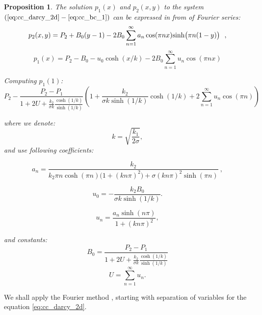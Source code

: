 \documentclass[a4paper,10pt]{article}
\newtheorem{prop}{Proposition}
\begin{document}
\begin{prop}
The solution $p_1(x)$ and $p_2(x,y)$ to the system $(\ref{eq:cc_darcy_2d} - \ref{eq:cc_bc_1})$
can be expressed in from of Fourier series:
\begin{equation}
    \label{eq:p2_series}
    p_2(x,y) = P_2 + B_0(y-1) -2B_0 \sum_{n=1}^\infty a_n \cos(\pi n x) {\rm sinh} \big(\pi n(1-y)\big)  \ \ ,
\end{equation}
%
\begin{equation}
    \label{eq:p2_series}
    p_1(x) = P_2-B_0 -u_0 \cosh(x/k) -2B_0 \sum_{n=1}^\infty  u_n \cos(\pi n x) 
\end{equation}

Computing $p_1(1)$:
\[
    P_2
    - \frac{P_2 - P_1}{1 + 2  U + \frac{k_2}{\sigma k} \frac{\cosh(1/k)}{\sinh(1/k)}}  \left(
        1
        +\frac{k_2 }{\sigma k\sinh(1/k)} \cosh(1/k) 
        +2 \sum_{n=1}^\infty  u_n \cos(\pi n) 
      \right)
\]

where we denote:
\[
    k = \sqrt{\frac{k_1}{2\sigma}}, 
\]    
and use following coefficients:

\begin{equation}
    \label{eq:an}
    a_n = \frac{k_2}{ k_2 \pi n \cosh(\pi n) \big(1 + (k n \pi)^2\big) 
    + \sigma (k n \pi)^2 \sinh(\pi n)} \ , 
\end{equation}

\begin{equation}
    \label{eq:u0}
    u_0 = -\frac{k_2 B_0}{\sigma k\sinh(1/k)}.
\end{equation}

\begin{equation}
    \label{eq:un}
    u_n = \frac{a_n \sinh(n \pi)}{1 + (k n \pi)^2}, 
\end{equation}




and constants:
\begin{equation}
     \label{eq:b0}
     B_0 = \frac{P_2 - P_1}{1 + 2  U + \frac{k_2}{\sigma k} \frac{\cosh(1/k)}{\sinh(1/k)}} 
\end{equation}
\begin{equation}
    \label{eq:U}
    U =  \sum_{n=1}^{\infty} u_n.
\end{equation}

\end{prop}

We shall apply the Fourier method \cite{??}, starting with separation of variables for the equation \eqref{eq:cc_darcy_2d}.  
\end{document}
